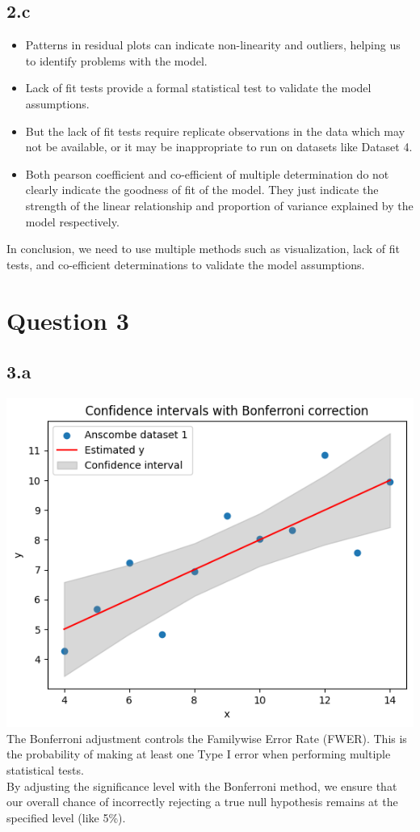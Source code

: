 \documentclass[12pt]{article}
\begin{document}
\subsection*{2.c}
\begin{itemize}
    \item Patterns in residual plots can indicate non-linearity and outliers,
    helping us to identify problems with the model.
    \item Lack of fit tests provide a formal statistical test to validate
    the model assumptions.
    \item But the lack of fit tests require replicate observations in the data
    which may not be available, or it may be inappropriate to run on datasets
    like Dataset 4.
    \item Both pearson coefficient and co-efficient of multiple determination
    do not clearly indicate the goodness of fit of the model. They just indicate
    the strength of the linear relationship and proportion of variance explained
    by the model respectively.
\end{itemize}
In conclusion, we need to use multiple methods such as visualization, lack of fit
tests, and co-efficient determinations to validate the model assumptions.

\newpage
\section*{Question 3}
\subsection*{3.a}
\includegraphics*[width=\linewidth]{graph3a}
The Bonferroni adjustment controls the Familywise Error Rate (FWER).
This is the probability of making at least one Type I error when performing
multiple statistical tests.
\\
By adjusting the significance level with the Bonferroni method,
we ensure that our overall chance of incorrectly rejecting a true null
hypothesis remains at the specified level (like 5\%).
\end{document}
